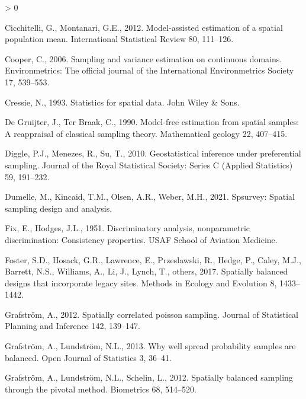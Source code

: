 \documentclass[]{elsarticle} %
\newlength{\cslhangindent}
\newenvironment{CSLReferences}[2] %
 {%
  \setlength{\parindent}{0pt}
  \ifodd #1 \everypar{\setlength{\hangindent}{\cslhangindent}}\ignorespaces\fi
  \ifnum #2 > 0
  \setlength{\parskip}{#2\baselineskip}
  \fi
 }%
 {}
\begin{document}
\begin{CSLReferences}{1}{0}
\leavevmode\hypertarget{ref-cicchitelli2012model}{}%
Cicchitelli, G., Montanari, G.E., 2012. Model-assisted estimation of a
spatial population mean. International Statistical Review 80, 111--126.

\leavevmode\hypertarget{ref-cooper2006sampling}{}%
Cooper, C., 2006. Sampling and variance estimation on continuous
domains. Environmetrics: The official journal of the International
Environmetrics Society 17, 539--553.

\leavevmode\hypertarget{ref-cressie1993statistics}{}%
Cressie, N., 1993. Statistics for spatial data. John Wiley \& Sons.

\leavevmode\hypertarget{ref-de1990model}{}%
De Gruijter, J., Ter Braak, C., 1990. Model-free estimation from spatial
samples: A reappraisal of classical sampling theory. Mathematical
geology 22, 407--415.

\leavevmode\hypertarget{ref-diggle2010geostatistical}{}%
Diggle, P.J., Menezes, R., Su, T., 2010. Geostatistical inference under
preferential sampling. Journal of the Royal Statistical Society: Series
C (Applied Statistics) 59, 191--232.

\leavevmode\hypertarget{ref-dumelle2021spsurvey}{}%
Dumelle, M., Kincaid, T.M., Olsen, A.R., Weber, M.H., 2021. Spsurvey:
Spatial sampling design and analysis.

\leavevmode\hypertarget{ref-fix1951discriminatory}{}%
Fix, E., Hodges, J.L., 1951. Discriminatory analysis, nonparametric
discrimination: Consistency properties. USAF School of Aviation
Medicine.

\leavevmode\hypertarget{ref-foster2017spatially}{}%
Foster, S.D., Hosack, G.R., Lawrence, E., Przeslawski, R., Hedge, P.,
Caley, M.J., Barrett, N.S., Williams, A., Li, J., Lynch, T., others,
2017. Spatially balanced designs that incorporate legacy sites. Methods
in Ecology and Evolution 8, 1433--1442.

\leavevmode\hypertarget{ref-grafstrom2012spatiallypoisson}{}%
Grafström, A., 2012. Spatially correlated poisson sampling. Journal of
Statistical Planning and Inference 142, 139--147.

\leavevmode\hypertarget{ref-grafstrom2013well}{}%
Grafström, A., Lundström, N.L., 2013. Why well spread probability
samples are balanced. Open Journal of Statistics 3, 36--41.

\leavevmode\hypertarget{ref-grafstrom2012spatially}{}%
Grafström, A., Lundström, N.L., Schelin, L., 2012. Spatially balanced
sampling through the pivotal method. Biometrics 68, 514--520.


\end{CSLReferences}
\end{document}
